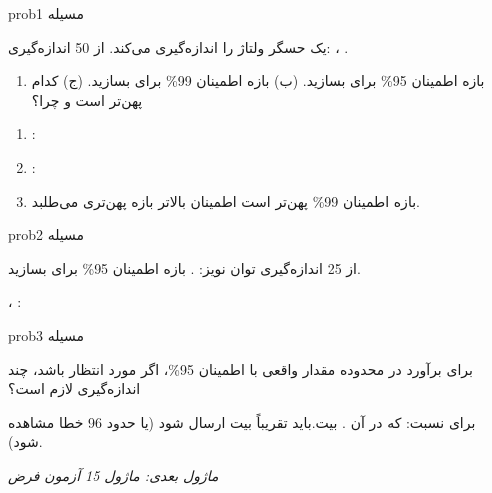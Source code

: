 
\begin{PSbox}[unbreakable]{prob}{مسیله 1}

یک حسگر ولتاژ را اندازه‌گیری می‌کند. از 50 اندازه‌گیری: ، .

\begin{enumerate}
\def\labelenumi{(\PSalph{enumi})}
\tightlist
\item
  بازه اطمینان 95\% برای \lr{$\mu$} بسازید. (ب) بازه اطمینان 99\% برای \lr{$\mu$} بسازید. (ج) کدام پهن‌تر است و چرا؟
\end{enumerate}

\PSsolution{} 

\begin{enumerate}
\def\labelenumi{(\PSalph{enumi})}
\tightlist
\item
  : 
\item
  : 
\item
  بازه اطمینان 99\% پهن‌تر است  اطمینان بالاتر بازه پهن‌تری می‌طلبد.
\end{enumerate}

\end{PSbox}

\begin{PSbox}[unbreakable]{prob}{مسیله 2}

از 25 اندازه‌گیری توان نویز: . بازه اطمینان 95\% برای  بسازید.

\PSsolution{} ، \PSbr{}: 

\end{PSbox}

\begin{PSbox}[unbreakable]{prob}{مسیله 3}

برای برآورد  در محدوده  مقدار واقعی با اطمینان 95\%، اگر  مورد انتظار  باشد، چند اندازه‌گیری  لازم است؟

\PSsolution{} برای نسبت:  که در آن .\PSbr{} بیت.\PSbr{}باید تقریباً  بیت ارسال شود (یا حدود 96 خطا مشاهده شود).

\emph{ماژول بعدی: {ماژول 15  آزمون فرض}}

\end{PSbox}

